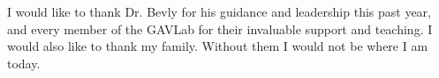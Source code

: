 I would like to thank Dr. Bevly for his guidance and leadership this past year, and every member of the GAVLab for their invaluable support and teaching. I would also like to thank my family. Without them I would not be where I am today.
